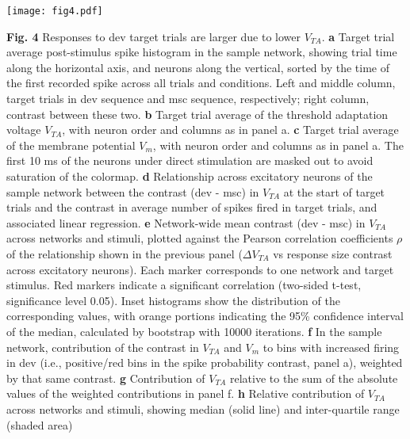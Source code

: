 \documentclass[pdflatex,referee,iicol,sn-basic]{sn-jnl}
\theoremstyle{thmstyleone}%
\theoremstyle{thmstyletwo}%
\theoremstyle{thmstylethree}%
\begin{document}
\begin{figure*}%
    \centering
    \texttt{[image: fig4.pdf]}
    \caption{}
    \label{fig4}
\end{figure*}
\textbf{Fig. 4} Responses to dev target trials are larger due to lower $V_{TA}$.
\textbf{a} Target trial average post-stimulus spike histogram in the sample network, showing trial time along the horizontal axis, and neurons along the vertical, sorted by the time of the first recorded spike across all trials and conditions. Left and middle column, target trials in dev sequence and msc sequence, respectively; right column, contrast between these two.
\textbf{b} Target trial average of the threshold adaptation voltage $V_{TA}$, with neuron order and columns as in panel a.
\textbf{c} Target trial average of the membrane potential $V_m$, with neuron order and columns as in panel a. The first 10 ms of the neurons under direct stimulation are masked out to avoid saturation of the colormap.
\textbf{d} Relationship across excitatory neurons of the sample network between the contrast (dev - msc) in $V_{TA}$ at the start of target trials and the contrast in average number of spikes fired in target trials, and associated linear regression.
\textbf{e} Network-wide mean contrast (dev - msc) in $V_{TA}$ across networks and stimuli, plotted against the Pearson correlation coefficients $\rho$ of the relationship shown in the previous panel ($\Delta V_{TA}$ vs response size contrast across excitatory neurons). Each marker corresponds to one network and target stimulus. Red markers indicate a significant correlation (two-sided t-test, significance level 0.05). Inset histograms show the distribution of the corresponding values, with orange portions indicating the 95\% confidence interval of the median, calculated by bootstrap with 10000 iterations.
\textbf{f} In the sample network, contribution of the contrast in $V_{TA}$ and $V_m$ to bins with increased firing in dev (i.e., positive/red bins in the spike probability contrast, panel a), weighted by that same contrast.
\textbf{g} Contribution of $V_{TA}$ relative to the sum of the absolute values of the weighted contributions in panel f.
\textbf{h} Relative contribution of $V_{TA}$ across networks and stimuli, showing median (solid line) and inter-quartile range (shaded area)
\end{document}
